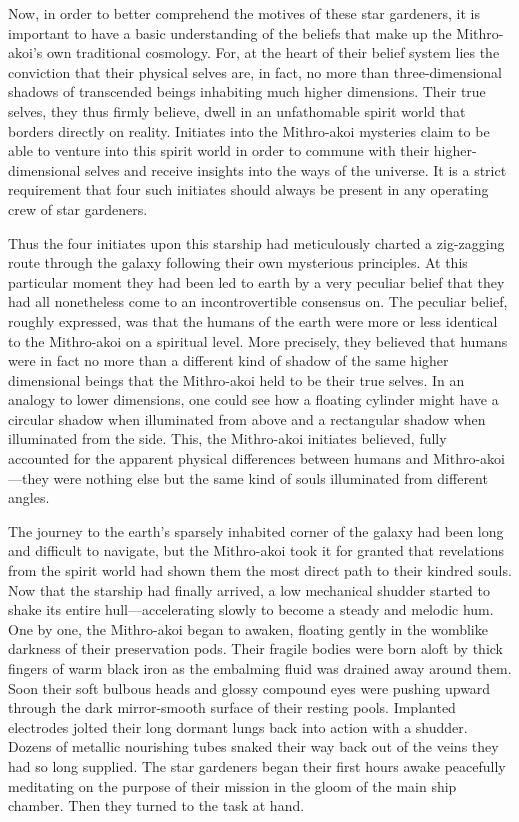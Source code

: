 \documentclass[14pt]{extarticle}
\begin{document}
Now,
in order to better comprehend the motives of these star gardeners,
it is important to have a basic understanding of the beliefs that make up the Mithro-akoi's own traditional cosmology.
For, at the heart of their belief system lies the conviction that their physical selves are, in fact, no more than three-dimensional shadows of transcended beings inhabiting much higher dimensions.
Their true selves, they thus firmly believe, dwell in an unfathomable spirit world that borders directly on reality.
Initiates into the Mithro-akoi mysteries claim to be able to venture into this spirit world in order to commune with their higher-dimensional selves and receive insights into the ways of the universe.
It is a strict requirement that four such initiates should always be present in any operating crew of star gardeners.

Thus the four initiates upon this starship had meticulously charted a zig-zagging route through the galaxy following their own mysterious principles.
At this particular moment they had been led to earth by a very peculiar belief that they had all nonetheless come to an incontrovertible consensus on.
The peculiar belief, roughly expressed, was that the humans of the earth were more or less identical to the Mithro-akoi on a spiritual level.
More precisely, they believed that humans were in fact no more than a different kind of shadow of the same higher dimensional beings that the Mithro-akoi held to be their true selves.
In an analogy to lower dimensions, one could see how a floating cylinder might have a circular shadow when illuminated from above and a rectangular shadow when illuminated from the side.
This, the Mithro-akoi initiates believed, fully accounted for the apparent physical differences between humans and Mithro-akoi---they were nothing else but the same kind of souls illuminated from different angles.

The journey to the earth's sparsely inhabited corner of the galaxy had been long and difficult to navigate, 
but the Mithro-akoi took it for granted that revelations from the spirit world had shown them the most direct path to their kindred souls.
Now that the starship had finally arrived, a low mechanical shudder started to shake its entire hull---accelerating slowly to become a steady and melodic hum.
One by one, the Mithro-akoi began to awaken,
floating gently in the womblike darkness of their preservation pods.
Their fragile bodies were born aloft by thick fingers of warm black iron as the embalming fluid was drained away around them.
Soon their soft bulbous heads and glossy compound eyes were pushing upward through the dark mirror-smooth surface of their resting pools.
Implanted electrodes jolted their long dormant lungs back into action with a shudder.
Dozens of metallic nourishing tubes snaked their way back out of the veins they had so long supplied.
The star gardeners began their first hours awake peacefully meditating on the purpose of their mission in the gloom of the main ship chamber.
Then they turned to the task at hand.
\end{document}
